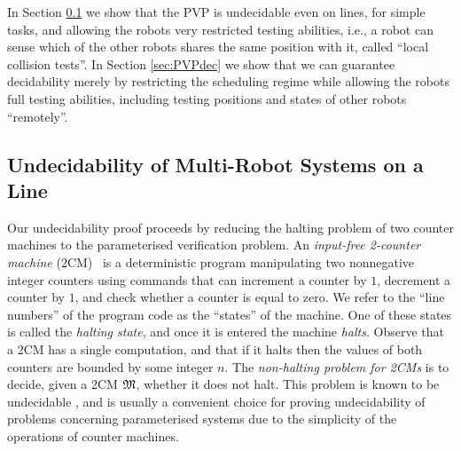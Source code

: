 \documentclass{llncs}
\begin{document}
In Section \ref{sec:PVPundec} we show that the PVP is undecidable even on lines, for simple tasks, and allowing the robots very restricted testing abilities, i.e., a robot can sense which of the other robots shares the same position with it, called ``local collision tests''.  In Section \ref{sec:PVPdec} we show that we can guarantee decidability merely by restricting the scheduling regime while allowing the robots full testing abilities, including testing positions and states of other robots ``remotely''.


\subsection{Undecidability of Multi-Robot Systems on a Line} \label{sec:PVPundec}
Our undecidability proof proceeds by reducing the halting problem of two counter machines to the parameterised verification problem. An \emph{input-free 2-counter machine} (2CM)~\cite{Minsky67} is a deterministic program manipulating two nonnegative integer counters using commands that can increment a counter by $1$, decrement a counter by $1$, and check whether a counter is equal to zero. We refer to the ``line numbers'' of the program code as the ``states'' of the machine. One of these states is called the \emph{halting state}, and once it is entered the machine \emph{halts}. Observe that a 2CM has a single computation, and that if it halts then the values of both counters are bounded by some integer $n$.
%
The \emph{non-halting problem for 2CMs} is to decide, given a 2CM $\mathfrak{M}$, whether it does not halt. This problem is known to be undecidable \cite{Minsky67}, and is usually a convenient choice for proving undecidability of problems concerning parameterised systems due to the simplicity of the operations of counter machines.
\end{document}
